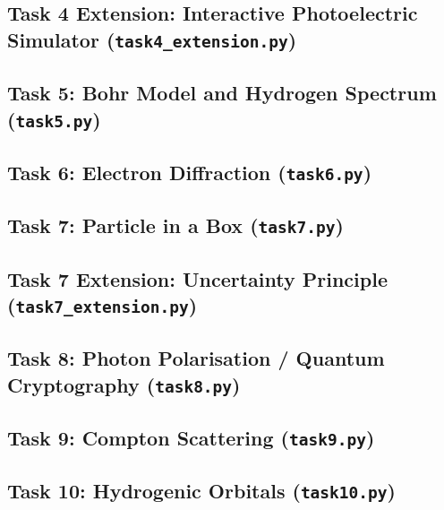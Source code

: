 \documentclass[11pt]{article}
\begin{document}
\subsection{Task 4 Extension: Interactive Photoelectric Simulator (\texttt{task4\_extension.py})}


\subsection{Task 5: Bohr Model and Hydrogen Spectrum (\texttt{task5.py})}


\subsection{Task 6: Electron Diffraction (\texttt{task6.py})}


\subsection{Task 7: Particle in a Box (\texttt{task7.py})}


\subsection{Task 7 Extension: Uncertainty Principle (\texttt{task7\_extension.py})}


\subsection{Task 8: Photon Polarisation / Quantum Cryptography (\texttt{task8.py})}


\subsection{Task 9: Compton Scattering (\texttt{task9.py})}


\subsection{Task 10: Hydrogenic Orbitals (\texttt{task10.py})}

\end{document}
